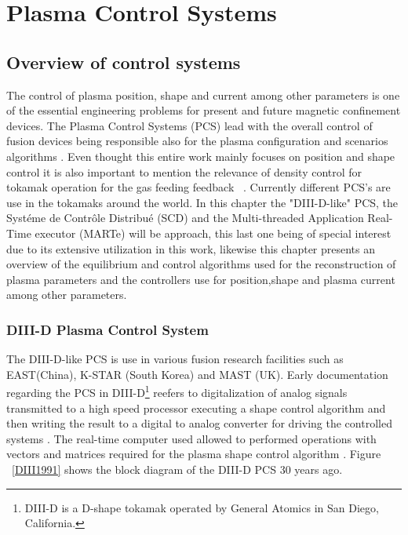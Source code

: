 \chapter{Plasma Control Systems}

\section{Overview of control systems}
The control of  plasma position, shape and current among other parameters is one of the essential engineering problems for present and future magnetic confinement devices. The Plasma Control Systems (PCS) lead with the overall control of  fusion devices being responsible also for the  plasma configuration and scenarios algorithms \cite[Chapter~8]{PCS_2018}. Even thought this entire work mainly focuses on position and shape control it is also important to mention the relevance of density control for tokamak operation for the gas feeding feedback ~\cite{densityControl}. Currently different PCS's are use in the tokamaks around the world. In this chapter the "DIII-D-like" PCS, the Syst\'eme de Contr\^ole Distribu\'e (SCD) and the Multi-threaded Application Real-Time executor (MARTe) will be approach, this last one being of special interest due to its extensive utilization in this work, likewise this chapter presents an overview of the equilibrium and control algorithms used for the reconstruction of plasma parameters and the controllers use for position,shape and plasma current among other parameters. 

\subsection{DIII-D Plasma Control System}  

The DIII-D-like PCS is use in various fusion research facilities such as EAST(China), K-STAR (South Korea) and MAST (UK). Early documentation regarding the PCS in DIII-D\footnote{DIII-D is a D-shape tokamak operated by General Atomics in San Diego, California. } reefers to digitalization of analog signals transmitted to a high speed processor executing a shape control algorithm and then writing the result to a digital to analog converter for driving the controlled systems . The real-time computer used allowed to performed operations with vectors and matrices required for the plasma shape control algorithm \cite{DIIDcontrol}. Figure ~\ref{DIII1991} shows the block diagram of the DIII-D PCS 30 years ago.
\smallskip


